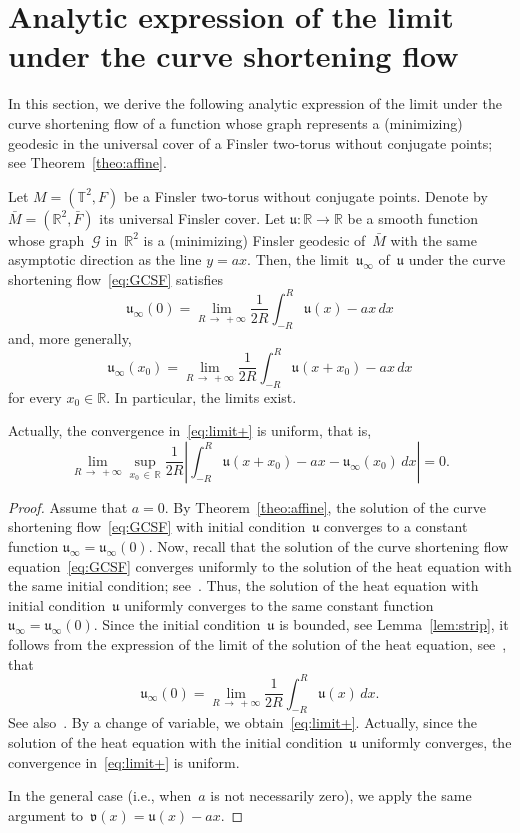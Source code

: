 \documentclass[AHL,Unicode,longabstracts,published]{cedram}
\newcommand{\GG}{\mathcal{G}}
\newcommand{\R}{\mathbb{R}}
\newcommand{\T}{\mathbb{T}}
\newcommand{\bu}{\mathfrak{u}}
\newcommand{\bv}{\mathfrak{v}}
\newcommand{\ie}{i.e.}
\begin{document}
\section{Analytic expression of the limit under the curve shortening flow}

In this section, we derive the following analytic expression of the limit under the curve shortening flow of a function whose graph represents a (minimizing) geodesic in the universal cover of a Finsler two-torus without conjugate points; see Theorem~\ref{theo:affine}.

\begin{prop}\label{prop:limit}
Let $M=(\T^2,F)$ be a Finsler two-torus without conjugate points. Denote by~$\bar{M}=(\R^2,\bar{F})$ its universal Finsler cover. Let $\bu:\R \to \R$ be a smooth function whose graph~$\GG$ in~$\R^2$ is a (minimizing) Finsler geodesic of~$\bar{M}$ with the same asymptotic direction as the line $y=ax$. Then, the limit~$\bu_\infty$ of~$\bu$ under the curve shortening flow~\eqref{eq:GCSF} satisfies
\[
\bu_\infty(0) = \lim_{R\, \to\,+\infty} \frac{1}{2R} \int_{-R}^R \bu(x) - ax \, dx
\]
and, more generally,
\begin{equation}\label{eq:limit+}
\bu_\infty(x_0) = \lim_{R\,\to\,+\infty} \frac{1}{2R} \int_{-R}^R \bu(x+x_0) - ax \, dx
\end{equation}
for every $x_0 \in \R$. In particular, the limits exist.

Actually, the convergence in~\eqref{eq:limit+} is uniform, that is,
\[
\lim_{R\,\to\,+\infty} \sup_{x_0\,\in\,\R} \frac{1}{2R} \left| \int_{-R}^R \bu(x+x_0) - ax - \bu_\infty(x_0) \, dx \right| =0.
\]
\end{prop}

\begin{proof}
Assume that $a=0$. By Theorem~\ref{theo:affine}, the solution of the curve shortening flow~\eqref{eq:GCSF} with initial condition~$\bu$ converges to a constant function $\bu_{\infty}=\bu_{\infty}(0)$. Now, recall that the solution of the curve shortening flow equation~\eqref{eq:GCSF} converges uniformly to the solution of the heat equation with the same initial condition; see~\cite[Theorem~1.4]{NT07}. Thus, the solution of the heat equation with initial condition~$\bu$ uniformly converges to the same constant function $\bu_{\infty}=\bu_{\infty}(0)$. Since the initial condition~$\bu$ is bounded, see Lemma~\ref{lem:strip}, it follows from the expression of the limit of the solution of the heat equation, see~\cite{RE66, RE67}, that
\[
\bu_\infty(0) = \lim_{R\,\to\,+\infty} \frac{1}{2R} \int_{-R}^R \bu(x) \, dx.
\]
See also~\cite[\S~3]{NT07}. By a change of variable, we obtain~\eqref{eq:limit+}. Actually, since the solution of the heat equation with the initial condition~$\bu$ uniformly converges, the convergence in~\eqref{eq:limit+} is uniform.

In the general case (\ie, when~$a$ is not necessarily zero), we apply the same argument to~$\bv(x)=\bu(x) - ax$.
\end{proof}
\end{document}
